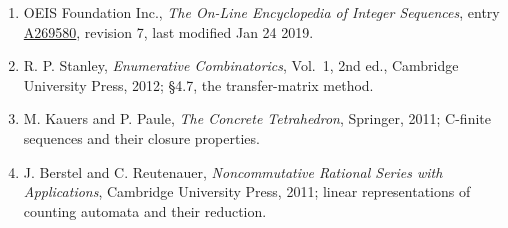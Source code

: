 \documentclass[11pt]{article}
\theoremstyle{definition}
\begin{document}
\begin{enumerate}

\item OEIS Foundation Inc., \emph{The On-Line Encyclopedia of Integer Sequences}, entry \href{https://oeis.org/A269580}{A269580}, revision 7, last modified Jan 24 2019.

\item R. P. Stanley, \emph{Enumerative Combinatorics}, Vol.~1, 2nd ed., Cambridge University Press, 2012; \S4.7, the transfer-matrix method.

\item M. Kauers and P. Paule, \emph{The Concrete Tetrahedron}, Springer, 2011; C-finite sequences and their closure properties.

\item J. Berstel and C. Reutenauer, \emph{Noncommutative Rational Series with Applications}, Cambridge University Press, 2011; linear representations of counting automata and their reduction.

\end{enumerate}
\end{document}
